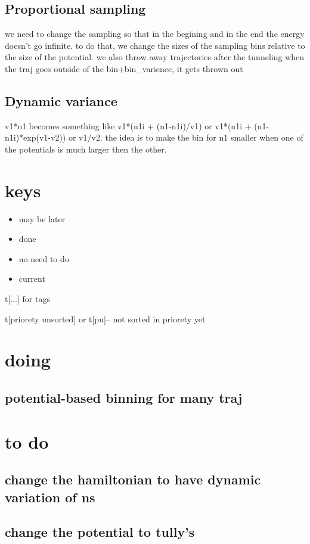 \documentclass{article}
\let\Item\item
\renewcommand\item{\normalcolor\Item}
\newcommand\ml{\color[RGB]{153, 150, 204}} %
\newcommand\nn{\color[RGB]{124, 124, 255}} %
\newcommand\done{\color[RGB]{129, 180, 185} \ding{52} }
\newcommand\now{\color[RGB]{255, 0, 0}} %
\begin{document}
\subsection{Proportional sampling}
we need to change the sampling so that in the begining and in the end the energy doesn't go infinite.
to do that, we change the sizes of the sampling bins relative to the size of the potential. we also throw away trajectories after the tunneling
when the traj goes outside of the bin+bin\_varience, it gets thrown out
\subsection{Dynamic variance}
v1*n1 becomes something like v1*(n1i + (n1-n1i)/v1) or v1*(n1i + (n1-n1i)*exp(v1-v2)) or v1/v2.
the idea is to make the bin for n1 smaller when one of the potentials is much larger then the other. 



\section{keys}
\begin{itemize}
  \item \ml may be later
  \item \done done
  \item \nn no need to do
  \item \now current 
\end{itemize}

t[...] for tags

t[priorety unsorted] or t[pu]-- not sorted in priorety yet

\section{doing}
\subsection{potential-based binning for many traj}
\section{to do}
\subsection{change the hamiltonian to have dynamic variation of ns}
\subsection{change the potential to tully's}
\end{document}
